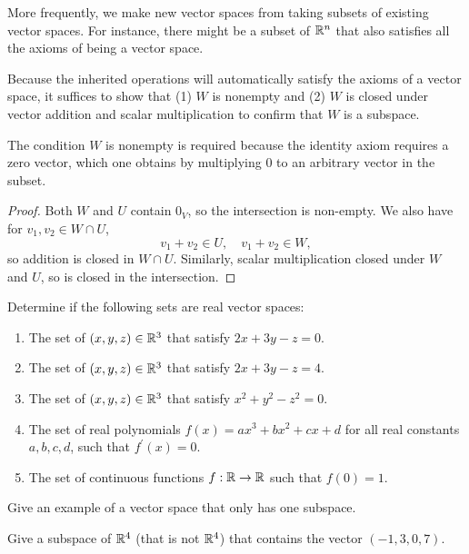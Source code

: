 More frequently, we make new vector spaces from taking subsets of existing vector spaces. For instance, there might be a subset of $\mathbb{R}^n$ that also satisfies all the axioms of being a vector space.

\begin{remark}
	Because the inherited operations will automatically satisfy the axioms of a vector space, it suffices to show that (1) $W$ is nonempty and (2) $W$ is closed under vector addition and scalar multiplication to confirm that $W$ is a subspace.
\end{remark}
The condition $W$ is nonempty is required because the identity axiom requires a zero vector, which one obtains by multiplying $0$ to an arbitrary vector in the subset.
\begin{proof}
	Both $W$ and $U$ contain $0_V$, so the intersection is non-empty. We also have for $v_1,v_2\in W\cap U$,\[
		v_1 + v_2 \in U, \quad v_1+v_2\in W,
	\] so addition is closed in $W\cap U$. Similarly, scalar multiplication closed under $W$ and $U$, so is closed in the intersection.
\end{proof}
\exercises
\begin{exerciselist}
	\item Determine if the following sets are real vector spaces:\begin{enumerate}[label=(\alph*)]
		\item The set of $(x,y,z)\in \mathbb{R}^3$ that satisfy $2x+3y-z=0$. 
		\item The set of $(x,y,z)\in \mathbb{R}^3$ that satisfy $2x+3y-z=4$.
		\item  The set of $(x,y,z)\in \mathbb{R}^3$ that satisfy $x^2+y^2-z^2=0$.
		\item The set of real polynomials $f(x)=ax^3+bx^2+cx+d$ for all real constants $a,b,c,d$, such that $f^\prime (x)=0$.
		\item The set of continuous functions $f:\mathbb{R}\to\mathbb{R}$ such that $f(0)=1$.
	\end{enumerate}
	\item Give an example of a vector space that only has one subspace.
	\item Give a subspace of $\mathbb{R}^4$ (that is not $\mathbb{R}^4$) that contains the vector $(-1,3,0,7)$.
\end{exerciselist}


